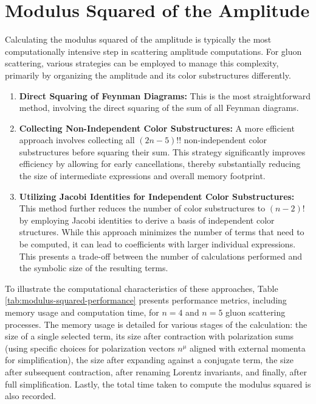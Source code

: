 \documentclass[main.tex]{subfiles}
\begin{document}
\section{Modulus Squared of the Amplitude}

Calculating the modulus squared of the amplitude is typically the most computationally intensive step in scattering amplitude computations. 
For gluon scattering, various strategies can be employed to manage this complexity, primarily by organizing the amplitude and its color 
substructures differently.

\begin{enumerate}
    \item \textbf{Direct Squaring of Feynman Diagrams:} This is the most straightforward method, involving the direct squaring of the sum of all Feynman diagrams.

    \item \textbf{Collecting Non-Independent Color Substructures:} A more efficient approach involves collecting all $(2n-5)!!$ non-independent color substructures before squaring their sum. 
    This strategy significantly improves efficiency by allowing for early cancellations, thereby substantially reducing the size of intermediate expressions and overall memory footprint.

    \item \textbf{Utilizing Jacobi Identities for Independent Color Substructures:} This method further reduces the number of color substructures to $(n-2)!$ by employing Jacobi identities to derive a basis of independent color structures. 
    While this approach minimizes the number of terms that need to be computed, it can lead to coefficients with larger individual expressions. This presents a trade-off between the number of calculations performed and the symbolic size of the resulting terms.
\end{enumerate}

To illustrate the computational characteristics of these approaches, Table \ref{tab:modulus-squared-performance} presents performance metrics,
including memory usage and computation time, for $n=4$ and $n=5$ gluon scattering processes.
The memory usage is detailed for various stages of the calculation: the size of a single selected term, its size after contraction with polarization sums (using specific choices for polarization vectors $n^{\mu}$ aligned with external momenta for simplification),
the size after expanding against a conjugate term, the size after subsequent contraction, after renaming Lorentz invariants, and finally, after full simplification. Lastly,
the total time taken to compute the modulus squared is also recorded.
\end{document}
